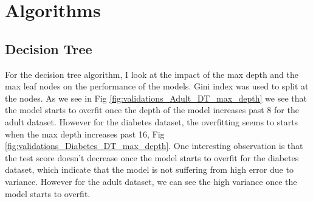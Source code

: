 \documentclass[11pt, twocolumn]{article}
\begin{document}
    \section{Algorithms}
    \subsection{Decision Tree}

    For the decision tree algorithm, I look at the impact of the max depth and the max leaf nodes on the performance of the models. Gini index was used to split at the nodes. As we see in Fig \ref{fig:validations_Adult_DT_max_depth} we see that the model starts to overfit once the depth of the model increases past 8 for the adult dataset. However for the diabetes dataset, the overfitting seems to starts when the max depth increases past 16, Fig \ref{fig:validations_Diabetes_DT_max_depth}. One interesting observation is that the test score doesn't decrease once the model starts to overfit for the diabetes dataset, which indicate that the model is not suffering from high error due to variance. However for the adult dataset, we can see the high variance once the model starts to overfit.
\end{document}

